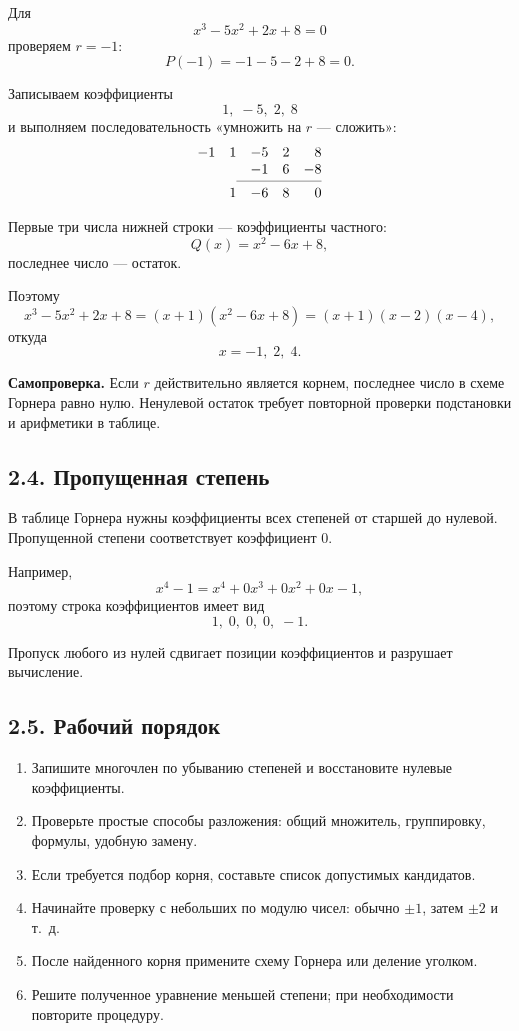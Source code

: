 \documentclass[a4paper,12pt]{article}
\newcommand{\keyidea}[2]{%
  \par\smallskip
  \noindent\textcolor{darkaccent}{\textbf{#1}} #2
  \par\smallskip
}
\begin{document}
Для
\[
x^3-5x^2+2x+8=0
\]
проверяем $r=-1$:
\[
P(-1)=-1-5-2+8=0.
\]

Записываем коэффициенты
\[
1,\;-5,\;2,\;8
\]
и выполняем последовательность
«умножить на $r$ --- сложить»:
\[
\begin{array}{c@{\quad}rrrr}
-1 & 1 & -5 & 2 & 8\\
   &   & -1 & 6 & -8\\
\cmidrule(lr){2-5}
   & 1 & -6 & 8 & 0
\end{array}
\]

Первые три числа нижней строки --- коэффициенты частного:
\[
Q(x)=x^2-6x+8,
\]
последнее число --- остаток.

Поэтому
\[
x^3-5x^2+2x+8
=
(x+1)(x^2-6x+8)
=
(x+1)(x-2)(x-4),
\]
откуда
\[
\boxed{x=-1,\;2,\;4}.
\]

\keyidea{Самопроверка.}{
Если $r$ действительно является корнем,
последнее число в схеме Горнера равно нулю.
Ненулевой остаток требует повторной проверки
подстановки и арифметики в таблице.
}

\subsection*{2.4. Пропущенная степень}

В таблице Горнера нужны коэффициенты всех степеней
от старшей до нулевой.
Пропущенной степени соответствует коэффициент $0$.

Например,
\[
x^4-1
=
x^4+0x^3+0x^2+0x-1,
\]
поэтому строка коэффициентов имеет вид
\[
1,\;0,\;0,\;0,\;-1.
\]

Пропуск любого из нулей
сдвигает позиции коэффициентов
и разрушает вычисление.

\subsection*{2.5. Рабочий порядок}

\begin{enumerate}
  \item
  Запишите многочлен по убыванию степеней
  и восстановите нулевые коэффициенты.

  \item
  Проверьте простые способы разложения:
  общий множитель,
  группировку,
  формулы,
  удобную замену.

  \item
  Если требуется подбор корня,
  составьте список допустимых кандидатов.

  \item
  Начинайте проверку с небольших по модулю чисел:
  обычно $\pm1$,
  затем $\pm2$ и т.~д.

  \item
  После найденного корня
  примените схему Горнера или деление уголком.

  \item
  Решите полученное уравнение меньшей степени;
  при необходимости повторите процедуру.
\end{enumerate}
\end{document}
